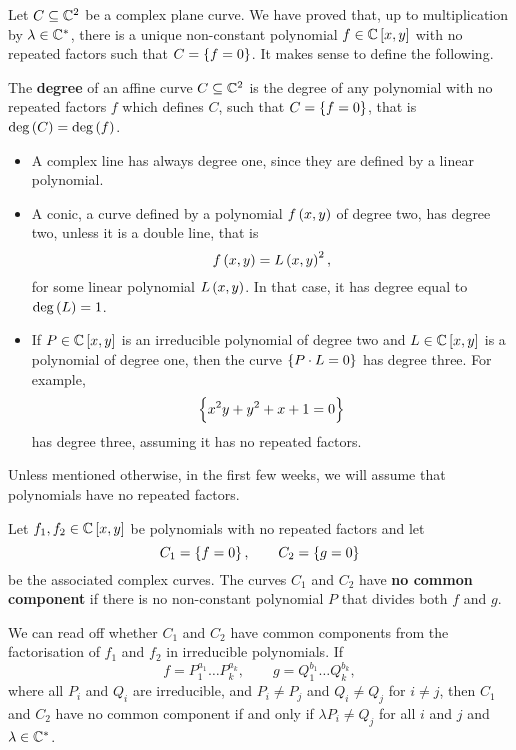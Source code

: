 \pagebreak

Let $ C \subseteq \mathbb{C}^2 $ be a complex plane curve. We have proved that, up to multiplication by $ \lambda \in \mathbb{C}^* $, there is a unique non-constant polynomial $ f \in \C\sbr{x, y} $ with no repeated factors such that $ C = \cbr{f = 0} $. It makes sense to define the following.

\begin{definition}
The \textbf{degree} of an affine curve $ C \subseteq \mathbb{C}^2 $ is the degree of any polynomial with no repeated factors $ f $ which defines $ C $, such that $ C = \cbr{f = 0} $, that is $ \deg\br{C} = \deg\br{f} $.
\end{definition}

\begin{example}
\hfill
\begin{itemize}
\item A complex line has always degree one, since they are defined by a linear polynomial.
\item A conic, a curve defined by a polynomial $ f\br{x, y} $ of degree two, has degree two, unless it is a double line, that is
$$ f\br{x, y} = L\br{x, y}^2, $$
for some linear polynomial $ L\br{x, y} $. In that case, it has degree equal to $ \deg\br{L} = 1 $.
\item If $ P \in \C\sbr{x, y} $ is an irreducible polynomial of degree two and $ L \in \C\sbr{x, y} $ is a polynomial of degree one, then the curve $ \cbr{P \cdot L = 0} $ has degree three. For example,
$$ \cbr{x^2y + y^2 + x + 1 = 0} $$
has degree three, assuming it has no repeated factors.
\end{itemize}
\end{example}

Unless mentioned otherwise, in the first few weeks, we will assume that polynomials have no repeated factors.

\begin{definition}
Let $ f_1, f_2 \in \C\sbr{x, y} $ be polynomials with no repeated factors and let
$$ C_1 = \cbr{f = 0}, \qquad C_2 = \cbr{g = 0} $$
be the associated complex curves. The curves $ C_1 $ and $ C_2 $ have \textbf{no common component} if there is no non-constant polynomial $ P $ that divides both $ f $ and $ g $.
\end{definition}

We can read off whether $ C_1 $ and $ C_2 $ have common components from the factorisation of $ f_1 $ and $ f_2 $ in irreducible polynomials. If
$$ f = P_1^{a_1} \dots P_k^{a_k}, \qquad g = Q_1^{b_1} \dots Q_k^{b_k}, $$
where all $ P_i $ and $ Q_i $ are irreducible, and $ P_i \ne P_j $ and $ Q_i \ne Q_j $ for $ i \ne j $, then $ C_1 $ and $ C_2 $ have no common component if and only if $ \lambda P_i \ne Q_j $ for all $ i $ and $ j $ and $ \lambda \in \mathbb{C}^* $.

